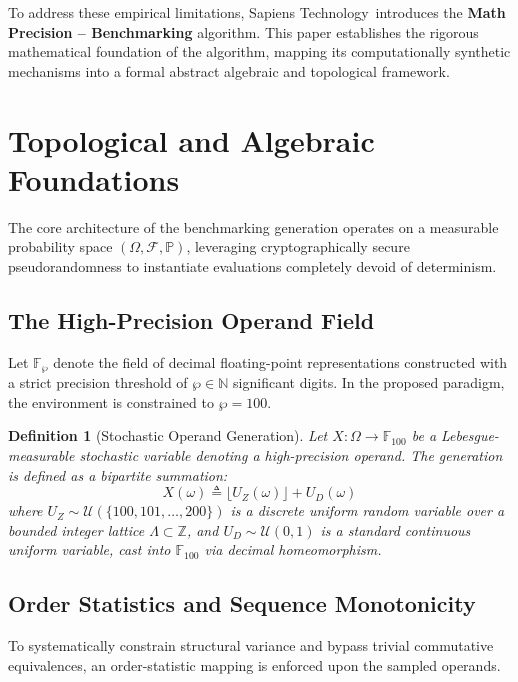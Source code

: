 \documentclass[12pt, a4paper]{article}
\newtheorem{definition}[theorem]{Definition}
\begin{document}
To address these empirical limitations, Sapiens Technology\textregistered \ introduces the \textbf{Math Precision -- Benchmarking} algorithm. This paper establishes the rigorous mathematical foundation of the algorithm, mapping its computationally synthetic mechanisms into a formal abstract algebraic and topological framework. 

\section{Topological and Algebraic Foundations}

The core architecture of the benchmarking generation operates on a measurable probability space $(\Omega, \mathcal{F}, \mathbb{P})$, leveraging cryptographically secure pseudorandomness to instantiate evaluations completely devoid of determinism. 

\subsection{The High-Precision Operand Field}
Let $\mathbb{F}_{\wp}$ denote the field of decimal floating-point representations constructed with a strict precision threshold of $\wp \in \mathbb{N}$ significant digits. In the proposed paradigm, the environment is constrained to $\wp = 100$.

\begin{definition}[Stochastic Operand Generation]
Let $X: \Omega \to \mathbb{F}_{100}$ be a Lebesgue-measurable stochastic variable denoting a high-precision operand. The generation is defined as a bipartite summation:
\begin{equation}
X(\omega) \triangleq \lfloor U_Z(\omega) \rfloor + U_D(\omega)
\end{equation}
where $U_Z \sim \mathcal{U}(\{100, 101, \dots, 200\})$ is a discrete uniform random variable over a bounded integer lattice $\Lambda \subset \mathbb{Z}$, and $U_D \sim \mathcal{U}(0, 1)$ is a standard continuous uniform variable, cast into $\mathbb{F}_{100}$ via decimal homeomorphism. 
\end{definition}

\subsection{Order Statistics and Sequence Monotonicity}
To systematically constrain structural variance and bypass trivial commutative equivalences, an order-statistic mapping is enforced upon the sampled operands. 
\end{document}
